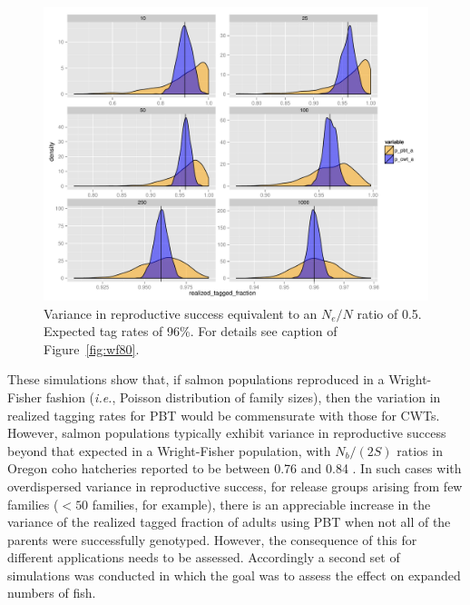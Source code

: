 \documentclass[11pt]{article}
\newcommand{\ie}{{\em i.e.},\xspace }
\begin{document}
\begin{figure}
\includegraphics[width = \textwidth]{images/tag_fracts_96_Ne50.pdf}
\caption{Variance in reproductive success equivalent to an $N_e/N$ ratio of 0.5. Expected tag rates of 96\%. For details
see caption of Figure~\protect\ref{fig:wf80}.}
\label{fig:ne50-96}
\end{figure}

These simulations show that, if salmon populations reproduced in a Wright-Fisher fashion
(\ie Poisson distribution of family sizes), then the variation in
realized tagging rates for PBT would be commensurate with those for CWTs.  However, salmon populations
typically exhibit variance in reproductive success beyond that expected in a Wright-Fisher population, with
$N_b/(2S)$ ratios in  Oregon coho hatcheries reported to be between 0.76 and 0.84  \citet{Moyeretal2007}. 
 In such cases with overdispersed variance in reproductive success,
for release groups arising from few families ($<50$ families, for example),
there is an appreciable increase in the variance of the realized tagged fraction of adults using PBT when
not all of the parents were successfully genotyped.  However,
the consequence of this for different applications needs to be assessed. Accordingly a second set of simulations
was conducted in which the goal was to assess the effect on expanded numbers of fish. 
\end{document}
